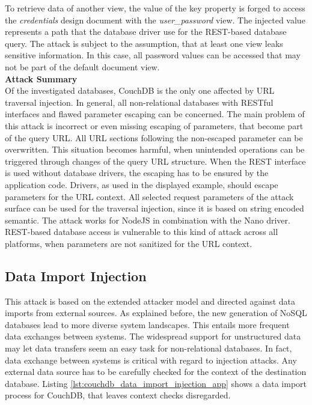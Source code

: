 To retrieve data of another view, the value of the key property is forged to access the \emph{credentials} design document with the \emph{user\_password} view. The injected value represents a path that the database driver use for the REST-based database query. The attack is subject to the assumption, that at least one view leaks sensitive information. In this case, all password values can be accessed that may not be part of the default document view. \\

\textbf{Attack Summary} \\
Of the investigated databases, CouchDB is the only one affected by URL traversal injection. In general, all non-relational databases with RESTful interfaces and flawed parameter escaping can be concerned. The main problem of this attack is incorrect or even missing escaping of parameters, that become part of the query URL. All URL sections following the non-escaped parameter can be overwritten. This situation becomes harmful, when unintended operations can be triggered through changes of the query URL structure. When the REST interface is used without database drivers, the escaping has to be ensured by the application code. Drivers, as used in the displayed example, should escape parameters for the URL context. All selected request parameters of the attack surface can be used for the traversal injection, since it is based on string encoded semantic. The attack works for NodeJS in combination with the Nano driver. REST-based database access is vulnerable to this kind of attack across all platforms, when parameters are not sanitized for the URL context. 

\subsection{Data Import Injection}
This attack is based on the extended attacker model and directed against data imports from external sources. As explained before, the new generation of NoSQL databases lead to more diverse system landscapes. This entails more frequent data exchanges between systems. The widespread support for unstructured data may let data transfers seem an easy task for non-relational databases. In fact, data exchange between systems is critical with regard to injection attacks. Any external data source has to be carefully checked for the context of the destination database. Listing \ref{lst:couchdb_data_import_injection_app} shows a data import process for CouchDB, that leaves context checks disregarded.\\

